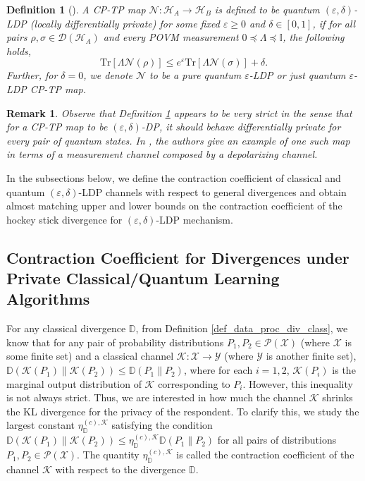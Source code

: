 \documentclass[onecolumn,ldraftcls, 11pt]{IEEEtran}
\newcommand{\tr}{\mathrm{Tr}}
\newcommand{\eps}{\varepsilon}
\newcommand*{\bbD}{\mathbb{D}}
\newcommand*{\bbI}{\mathbb{I}}
\newcommand*{\cP}{\mathcal{P}}
\newcommand*{\cH}{\mathcal{H}}
\newcommand*{\cD}{\mathcal{D}}
\newcommand*{\cK}{\mathcal{K}}
\newcommand*{\cN}{\mathcal{N}}
\newcommand*{\cX}{\mathcal{X}}
\newcommand*{\cY}{\mathcal{Y}}
\newtheorem{remark}{Remark}
\newtheorem{definition}{Definition}
\begin{document}
\begin{definition}[{\cite{AK25}}]\label{QLDP_def}
    A CP-TP map $\cN : \cH_A \to \cH_B$ is defined to be quantum $(\eps,\delta)$-LDP (locally differentially private) for some fixed $\eps \geq 0$ and $\delta \in [0,1]$,
    if for all pairs $\rho,\sigma \in \cD(\cH_A)$ and every POVM measurement $0 \preceq \Lambda \preceq \bbI$, the following holds,
    \begin{equation}
            \tr[\Lambda \cN(\rho)] \leq e^{\eps} \tr[\Lambda \cN(\sigma)]+ \delta.\label{QLDP_def_eq}
    \end{equation}  
    Further, for $\delta = 0$, we denote $\cN$ to be a pure quantum $\eps$-LDP or just quantum $\eps$-LDP CP-TP map.
\end{definition}

\begin{remark}\label{remark_relax_QLDP}
Observe that Definition \ref{QLDP_def} appears to be very strict in the sense that for a CP-TP map to be $(\eps,\delta)$-DP, it should behave differentially private for every pair of quantum states. In \cite{Nuradha25}, the authors give an example of one such map in terms of a measurement channel composed by a depolarizing channel. 
\end{remark}




In the subsections below, we define the contraction coefficient of classical and quantum $(\eps,\delta)$-LDP channels with respect to general divergences and obtain almost matching upper and lower bounds on the contraction coefficient of the hockey stick divergence for  $(\eps,\delta)$-LDP mechanism.



\subsection{Contraction Coefficient for Divergences under Private Classical/Quantum Learning Algorithms}

For any classical divergence $\mathbb{D}$, from Definition \ref{def_data_proc_div_class}, we know that for any pair of probability distributions $P_1,P_2 \in \cP(\cX)$ (where $\cX$ is some finite set) and a classical channel $\cK : \cX \to \cY$ (where $\cY$ is another finite set), $ \bbD(\cK(P_1)\| \cK(P_2)) \leq \bbD(P_1\|P_2)$, where for each $i=1,2$, $\cK(P_i)$ is the marginal output distribution of $\cK$ corresponding to $P_i$.
However, this inequality is not always strict. 
Thus, we are interested in how much the channel $\cK$ shrinks the KL divergence for the privacy of the respondent. 
To clarify this, we study the largest constant 
$\eta^{(c), \cK}_{\bbD}$ satisfying the condition
$\bbD(\cK(P_1)\| \cK(P_2)) \leq \eta^{(c), \cK}_{\bbD} \bbD(P_1\|P_2)$ for all pairs of distributions  $P_1,P_2 \in \cP(\cX)$. 
The quantity $\eta^{(c), \cK}_{\bbD}$ is called the contraction coefficient of the channel $\cK$ with respect to the divergence $\bbD$.
\end{document}

